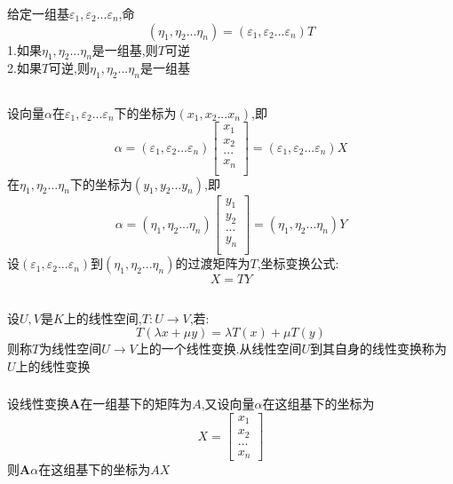\documentclass[11pt, a4paper, UTF8]{ctexart}
\begin{document}
\subsubsection{}
给定一组基$\varepsilon_1,\varepsilon_2...\varepsilon_n$,命
\[(\eta_1,\eta_2...\eta_n)=(\varepsilon_1,\varepsilon_2...\varepsilon_n)T\]
1.如果$\eta_1,\eta_2...\eta_n$是一组基,则$T$可逆\\
2.如果$T$可逆,则$\eta_1,\eta_2...\eta_n$是一组基
\subsection{}
设向量$\alpha$在$\varepsilon_1,\varepsilon_2...\varepsilon_n$下的坐标为$(x_1,x_2...x_n)$,即
\[\alpha=(\varepsilon_1,\varepsilon_2...\varepsilon_n)\begin{bmatrix}
x_1\\
x_2\\
...\\
x_n\\
\end{bmatrix}=(\varepsilon_1,\varepsilon_2...\varepsilon_n)X\]
在$\eta_1,\eta_2...\eta_n$下的坐标为$(y_1,y_2...y_n)$,即\\
\[\alpha=(\eta_1,\eta_2...\eta_n)\begin{bmatrix}
y_1\\
y_2\\
...\\
y_n\\
\end{bmatrix}=(\eta_1,\eta_2...\eta_n)Y\]
设$(\varepsilon_1,\varepsilon_2...\varepsilon_n)$到$(\eta_1,\eta_2...\eta_n)$的过渡矩阵为$T$,坐标变换公式:
\[X=TY\]
\subsection{}
设$U,V$是$K$上的线性空间,$T:U\to V$,若:\\
\[T(\lambda x+\mu y)=\lambda T(x)+\mu T(y)\]
则称$T$为线性空间$U\to V$上的一个线性变换.从线性空间$U$到其自身的线性变换称为$U$上的线性变换\\
\subsubsection{}
设线性变换$\bm A$在一组基下的矩阵为$A$,又设向量$\alpha$在这组基下的坐标为
\[X=\begin{bmatrix}
x_1\\
x_2\\
...\\
x_n
\end{bmatrix}\]
则$\bm A\alpha$在这组基下的坐标为$AX$
\end{document}

